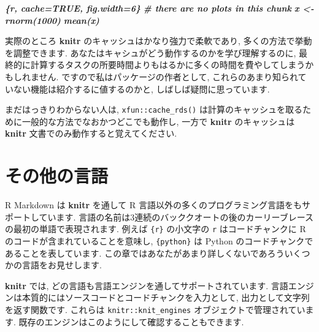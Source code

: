 \documentclass[
  11pt,
]{bxjsreport}
\newenvironment{Shaded}{\begin{snugshade}}{\end{snugshade}}
\newcommand{\FunctionTok}[1]{\textcolor[rgb]{0.00,0.00,0.00}{#1}}
\newcommand{\InformationTok}[1]{\textcolor[rgb]{0.56,0.35,0.01}{\textbf{\textit{#1}}}}
\newcommand{\NormalTok}[1]{#1}
\newcommand{\SpecialCharTok}[1]{\textcolor[rgb]{0.00,0.00,0.00}{#1}}
\begin{document}
\begin{Shaded}
\begin{Highlighting}[]
\InformationTok{\textasciigrave{}\textasciigrave{}\textasciigrave{}\{r, cache=TRUE, fig.width=6\}}
\InformationTok{\# there are no plots in this chunk}
\InformationTok{x \textless{}{-} rnorm(1000)}
\InformationTok{mean(x)}
\InformationTok{\textasciigrave{}\textasciigrave{}\textasciigrave{}}
\end{Highlighting}
\end{Shaded}

実際のところ \textbf{knitr} のキャッシュはかなり強力で柔軟であり, 多くの方法で挙動を調整できます. あなたはキャシュがどう動作するのかを学び理解するのに, 最終的に計算するタスクの所要時間よりもはるかに多くの時間を費やしてしまうかもしれません. ですので私はパッケージの作者として, これらのあまり知られていない機能は紹介するに値するのかと, しばしば疑問に思っています.

まだはっきりわからない人は, \texttt{xfun::cache\_rds()} は計算のキャッシュを取るために一般的な方法でなおかつどこでも動作し, 一方で \textbf{knitr} のキャッシュは \textbf{knitr} 文書でのみ動作すると覚えてください.

\hypertarget{other-languages}{%
\chapter{その他の言語}\label{other-languages}}

R Markdown は \textbf{knitr} を通して R 言語以外の多くのプログラミング言語をもサポートしています. 言語の名前は3連続のバッククオートの後のカーリーブレースの最初の単語で表現されます. 例えば \texttt{\textasciigrave{}\textasciigrave{}\textasciigrave{}\{r\}} の小文字の \texttt{r} はコードチャンクに R のコードが含まれていることを意味し, \texttt{\textasciigrave{}\textasciigrave{}\textasciigrave{}\{python\}} は Python のコードチャンクであることを表しています. この章ではあなたがあまり詳しくないであろういくつかの言語をお見せします.

\textbf{knitr} では, どの言語も言語エンジンを通してサポートされています. 言語エンジンは本質的にはソースコードとコードチャンクを入力として, 出力として文字列を返す関数です. これらは \texttt{knitr::knit\_engines} オブジェクトで管理されています. 既存のエンジンはこのようにして確認することもできます.

\begin{Shaded}
\end{Shaded}
\end{document}
